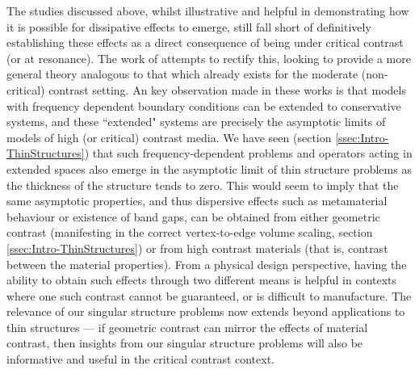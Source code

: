 The studies discussed above, whilst illustrative and helpful in demonstrating how it is possible for dissipative effects to emerge, still fall short of definitively establishing these effects as a direct consequence of being under critical contrast (or at resonance).
The work of \cite{cherednichenko2019unified, cherednichenko2019time} attempts to rectify this, looking to provide a more general theory analogous to that which already exists for the moderate (non-critical) contrast setting.
An key observation made in these works is that models with frequency dependent boundary conditions can be extended to conservative systems, and these ``extended" systems are precisely the asymptotic limits of models of high (or critical) contrast media. %
We have seen (section \ref{ssec:Intro-ThinStructures}) that such frequency-dependent problems and operators acting in extended spaces also emerge in the asymptotic limit of thin structure problems as the thickness of the structure tends to zero.
This would seem to imply that the same asymptotic properties, and thus dispersive effects such as metamaterial behaviour or existence of band gaps, can be obtained from either geometric contrast (manifesting in the correct vertex-to-edge volume scaling, section \ref{ssec:Intro-ThinStructures}) or from high contrast materials (that is, contrast between the material properties).
From a physical design perspective, having the ability to obtain such effects through two different means is helpful in contexts where one such contrast cannot be guaranteed, or is difficult to manufacture.
The relevance of our singular structure problems now extends beyond applications to thin structures --- if geometric contrast can mirror the effects of material contrast, then insights from our singular structure problems will also be informative and useful in the critical contrast context.